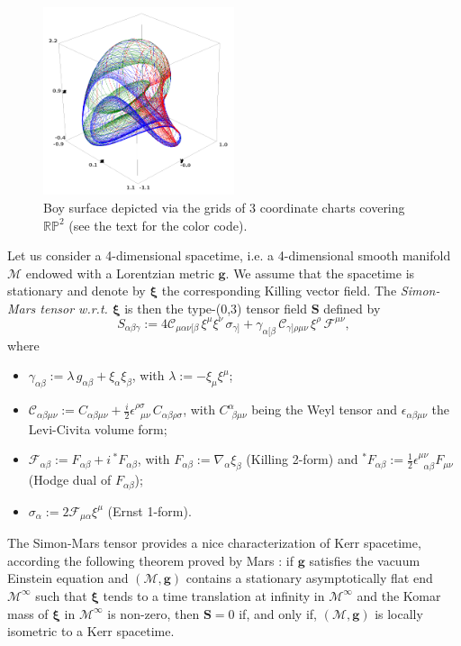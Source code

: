 \documentclass[a4paper]{jpconf}
\newcommand{\be}{\begin{equation}}
\newcommand{\ee}{\end{equation}}
\newcommand{\w}[1]{\bm{#1}}
\begin{document}
\begin{figure}
\begin{center}
\includegraphics[width=0.5\textwidth]{boy_surface.png}
\end{center}
\caption{\label{f:boy} Boy surface depicted via the grids of
3 coordinate charts covering
$\mathbb{RP}^2$ (see the text for the color code).}
\end{figure}



Let us consider a 4-dimensional spacetime, i.e. a 4-dimensional smooth 
manifold $\mathcal{M}$ endowed with a Lorentzian metric $\w{g}$. 
We assume that the spacetime is stationary and denote by $\w{\xi}$ 
the corresponding Killing vector field. 
The \emph{Simon-Mars tensor w.r.t. $\w{\xi}$} is then
the type-(0,3) tensor field $\w{S}$ defined by \cite{Mars99}
\be \label{e:def_Simon-Mars}
S_{\alpha\beta\gamma} := 4 \mathcal{C}_{\mu\alpha\nu[\beta} \, \xi^\mu \xi^\nu \, \sigma_{\gamma]}
 + \gamma_{\alpha[\beta} \, \mathcal{C}_{\gamma]\rho\mu\nu} \, \xi^\rho \, \mathcal{F}^{\mu\nu} ,
\ee
where
\begin{itemize}
\item $\gamma_{\alpha\beta} := \lambda \, g_{\alpha\beta} + \xi_\alpha \xi_\beta$, 
with $\lambda := - \xi_\mu \xi^\mu$;
\item $\mathcal{C}_{\alpha\beta\mu\nu} := C_{\alpha\beta\mu\nu}
    + \frac{i}{2} \epsilon^{\rho\sigma}_{\ \ \, \mu\nu}\,  C_{\alpha\beta\rho\sigma} $,
with $C^\alpha_{\ \, \beta\mu\nu}$ being the Weyl tensor and 
$\epsilon_{\alpha\beta\mu\nu}$ the Levi-Civita volume form;
\item $\mathcal{F}_{\alpha\beta} := F_{\alpha\beta} + i\,  {}^*\!F_{\alpha\beta}$, 
with $F_{\alpha\beta} := \nabla_\alpha\xi_\beta$ (Killing 2-form) and 
${}^*\!F_{\alpha\beta} := \frac{1}{2} \epsilon^{\mu\nu}_{\ \ \, \alpha\beta} F_{\mu\nu}$
(Hodge dual of $F_{\alpha\beta}$);
\item $\sigma_\alpha := 2 \mathcal{F}_{\mu\alpha} \xi^\mu$ (Ernst 1-form).
\end{itemize}
The Simon-Mars tensor provides a nice characterization of Kerr spacetime,
according the following theorem proved by Mars \cite{Mars99}:
if $\w{g}$ satisfies the vacuum Einstein equation and $(\mathcal{M},\w{g})$
contains a stationary asymptotically flat end $\mathcal{M}^\infty$ such
that $\w{\xi}$ tends to a time translation at infinity in $\mathcal{M}^\infty$
and the Komar mass of $\w{\xi}$ in $\mathcal{M}^\infty$ is non-zero, then 
$\w{S} = 0$ if, and only if, $(\mathcal{M},\w{g})$ is locally isometric 
to a Kerr spacetime.
\end{document}
